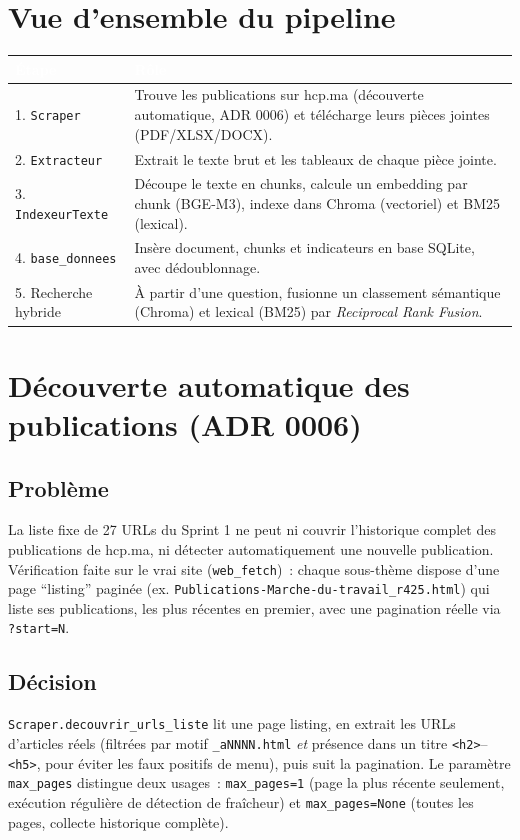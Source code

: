 \documentclass[11pt,a4paper]{article}
\newcommand{\tblhead}[1]{\textcolor{white}{\textbf{#1}}}
\begin{document}
\section{Vue d'ensemble du pipeline}
\begin{longtable}{@{}p{3.2cm}p{12.8cm}@{}}
\rowcolor{navy}
\tblhead{\'Etape} & \tblhead{R\^ole} \\
\midrule
\endhead
1. \texttt{Scraper} & Trouve les publications sur hcp.ma (d\'ecouverte automatique, ADR 0006) et t\'el\'echarge leurs pi\`eces jointes (PDF/XLSX/DOCX). \\
2. \texttt{Extracteur} & Extrait le texte brut et les tableaux de chaque pi\`ece jointe. \\
3. \texttt{IndexeurTexte} & D\'ecoupe le texte en chunks, calcule un embedding par chunk (BGE-M3), indexe dans Chroma (vectoriel) et BM25 (lexical). \\
4. \texttt{base\_donnees} & Ins\`ere document, chunks et indicateurs en base SQLite, avec d\'edoublonnage. \\
5. Recherche hybride & \`A partir d'une question, fusionne un classement s\'emantique (Chroma) et lexical (BM25) par \emph{Reciprocal Rank Fusion}. \\
\end{longtable}

\section{D\'ecouverte automatique des publications (ADR 0006)}

\subsection{Probl\`eme}
La liste fixe de 27 URLs du Sprint 1 ne peut ni couvrir l'historique complet des publications de hcp.ma, ni d\'etecter automatiquement une nouvelle publication. V\'erification faite sur le vrai site (\texttt{web\_fetch})~: chaque sous-th\`eme dispose d'une page ``listing'' pagin\'ee (ex. \texttt{Publications-Marche-du-travail\_r425.html}) qui liste ses publications, les plus r\'ecentes en premier, avec une pagination r\'eelle via \texttt{?start=N}.

\subsection{D\'ecision}
\texttt{Scraper.decouvrir\_urls\_liste} lit une page listing, en extrait les URLs d'articles r\'eels (filtr\'ees par motif \texttt{\_aNNNN.html} \emph{et} pr\'esence dans un titre \texttt{<h2>}--\texttt{<h5>}, pour \'eviter les faux positifs de menu), puis suit la pagination. Le param\`etre \texttt{max\_pages} distingue deux usages~: \texttt{max\_pages=1} (page la plus r\'ecente seulement, ex\'ecution r\'eguli\`ere de d\'etection de fra\^icheur) et \texttt{max\_pages=None} (toutes les pages, collecte historique compl\`ete).
\end{document}
